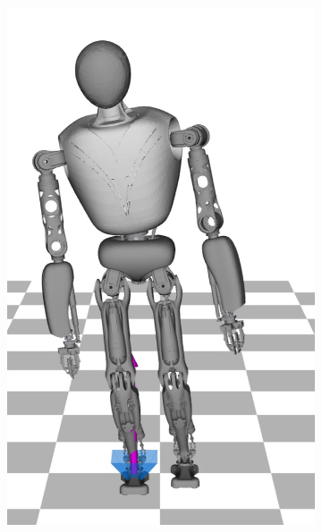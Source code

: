 \begin{figure}
\begin{subfigure}{.16\textwidth}
	\includegraphics[width=.95\linewidth]{fig/walkStatic/snaps/6}
	\caption{}
\end{subfigure}%
\begin{subfigure}{.16\textwidth}

\end{subfigure}
\end{figure}
